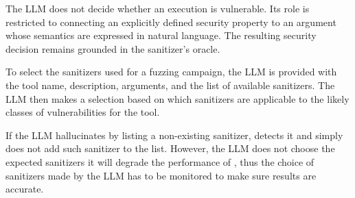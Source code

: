 The LLM does not decide whether an execution is vulnerable. Its role is
restricted to connecting an explicitly defined security property to an
argument whose semantics are expressed in natural language. The resulting
security decision remains grounded in the sanitizer's oracle.

To select the sanitizers used for a fuzzing campaign, the LLM is provided with the tool name, description, arguments, and the list of available sanitizers. The LLM then makes a selection based on which sanitizers are applicable to the likely classes of vulnerabilities for the tool.


If the LLM hallucinates by listing a non-existing sanitizer, \project{} detects it and simply does not add such sanitizer to the list. However, the LLM does not choose the expected sanitizers it will degrade the performance of \project{}, thus the choice of sanitizers made by the LLM has to be monitored to make sure results are accurate.




